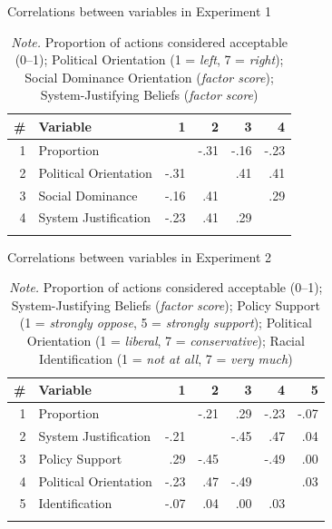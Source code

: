\documentclass[12pt, letterpaper]{article}
\begin{document}
\begin{table}[t!]
\caption{Correlations between variables in Experiment 1}
\centering
\begin{tabular}{rlrrrr}
\toprule
\# & Variable              &    1 &    2 &    3 &    4 \\ \midrule
 1 & Proportion            &      & -.31 & -.16 & -.23 \\
 2 & Political Orientation & -.31 &      &  .41 &  .41 \\
 3 & Social Dominance      & -.16 &  .41 &      &  .29 \\
 4 & System Justification  & -.23 &  .41 &  .29 &      \\ \bottomrule
\addlinespace
\end{tabular}
\caption*{\textit{Note.} Proportion of actions considered acceptable (0--1); Political Orientation (1 = \textit{left}, 7 = \textit{right}); Social Dominance Orientation (\textit{factor score}); System-Justifying Beliefs (\textit{factor score})}
\end{table}

\setcounter{table}{4}

\begin{table}[t!]
\caption{Correlations between variables in Experiment 2}
\centering
\begin{tabular}{rlrrrrr}
\toprule
\# & Variable              &    1 &    2 &    3 &    4 &    5 \\ \midrule
 1 & Proportion            &      & -.21 &  .29 & -.23 & -.07 \\
 2 & System Justification  & -.21 &      & -.45 &  .47 &  .04 \\
 3 & Policy Support        &  .29 & -.45 &      & -.49 &  .00 \\
 4 & Political Orientation & -.23 &  .47 & -.49 &      &  .03 \\
 5 & Identification        & -.07 &  .04 &  .00 &  .03 &      \\ \bottomrule
\addlinespace
\end{tabular}
\caption*{\textit{Note.} Proportion of actions considered acceptable (0--1); System-Justifying Beliefs (\textit{factor score}); Policy Support (1 = \textit{strongly oppose}, 5 = \textit{strongly support}); Political Orientation (1 = \textit{liberal}, 7 = \textit{conservative}); Racial Identification (1 = \textit{not at all}, 7 = \textit{very much})}
\end{table}

\setcounter{table}{5}
\end{document}
